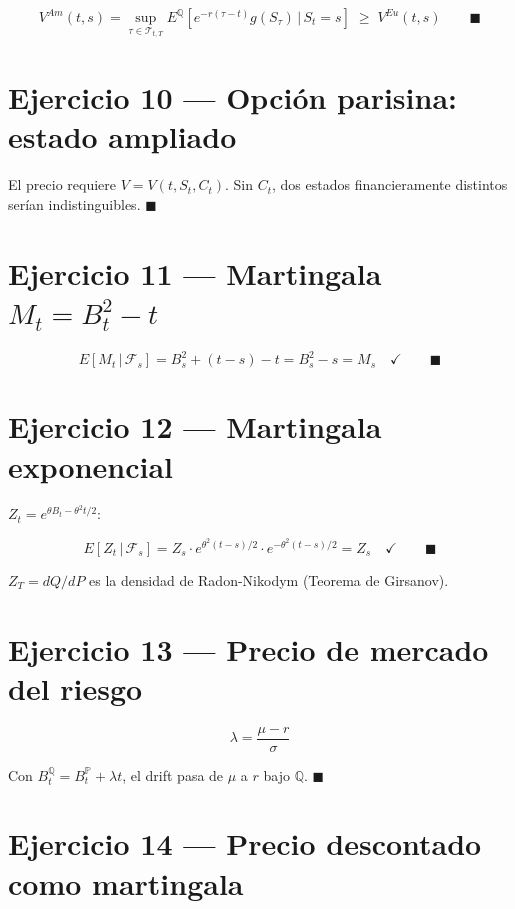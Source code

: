 \documentclass[12pt,letterpaper]{article}
\begin{document}
\[
  V^{Am}(t,s) = \sup_{\tau\in\mathcal{T}_{t,T}}
    E^\mathbb{Q}[e^{-r(\tau-t)}g(S_\tau)\,|\,S_t=s]
  \;\geq\; V^{Eu}(t,s) \qquad \blacksquare
\]

\section*{Ejercicio 10 --- Opci\'on parisina: estado ampliado}

El precio requiere $V = V(t, S_t, C_t)$. Sin $C_t$, dos estados
financieramente distintos ser\'ian indistinguibles. $\blacksquare$

\section*{Ejercicio 11 --- Martingala $M_t = B_t^2 - t$}

\[
  E[M_t\,|\,\mathcal{F}_s] = B_s^2 + (t-s) - t = B_s^2 - s = M_s
  \quad\checkmark \qquad \blacksquare
\]

\section*{Ejercicio 12 --- Martingala exponencial}

$Z_t = e^{\theta B_t - \theta^2 t/2}$:

\[
  E[Z_t\,|\,\mathcal{F}_s]
  = Z_s \cdot e^{\theta^2(t-s)/2} \cdot e^{-\theta^2(t-s)/2}
  = Z_s \quad\checkmark \qquad \blacksquare
\]

$Z_T = dQ/dP$ es la densidad de Radon-Nikodym (Teorema de Girsanov).

\section*{Ejercicio 13 --- Precio de mercado del riesgo}

\[
  \lambda = \frac{\mu - r}{\sigma}
\]

Con $B_t^\mathbb{Q} = B_t^\mathbb{P} + \lambda t$, el drift pasa de $\mu$ a
$r$ bajo $\mathbb{Q}$. $\blacksquare$

\section*{Ejercicio 14 --- Precio descontado como martingala}
\end{document}
